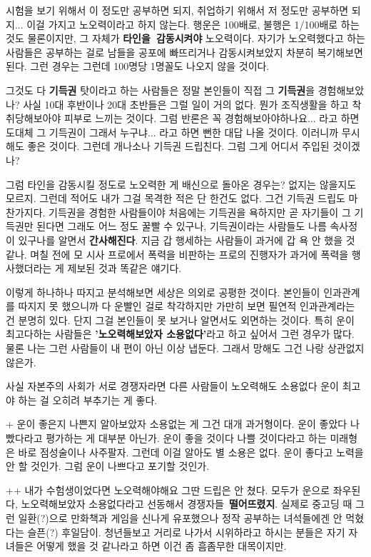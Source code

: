 시험을 보기 위해서 이 정도만 공부하면 되지, 취업하기 위해서 저 정도만 공부하면 되지... 이걸 가지고 노오력이라고 하지 않는다.
행운은 100배로, 불행은 1/100배로 하는 것도 물론이지만, 그 자체가 \textbf{타인을 감동시켜야} 노오력이다.
자기가 노오력했다고 하는 사람들은 공부하는 걸로 남들을 공포에 빠뜨리거나 감동시켜보았지 차분히 복기해보면 된다.
그런 경우는 그런데 100명당 1명꼴도 나오지 않을 것이다.
\vspace{5mm}

그것도 다 \textbf{기득권} 탓이라고 하는 사람들은 정말 본인들이 직접 그 \textbf{기득권}을 경험해보았나?
사실 10대 후반이나 20대 초반들은 그럴 일이 거의 없다. 뭔가 조직생활을 하고 착취당해보아야 피부로 느끼는 것이다.
그럼 반론은 꼭 경험해보아야하나요... 라고 하면 도대체 그 기득권이 그래서 누구냐... 라고 하면 뻔한 대답 나올 것이다.
이러니까 무시해도 좋은 것이다.
그런데 개나소나 기득권 드립친다. 그럼 그게 어디서 주입된 것이겠나?
\vspace{5mm}

그럼 타인을 감동시킬 정도로 노오력한 게 배신으로 돌아온 경우는?
없지는 않을지도 모르지. 그런데 적어도 내가 그걸 목격한 적은 단 한건도 없다.
그건 기득권 드립도 마찬가지다. 기득권을 경험한 사람들이야 처음에는 기득권을 욕하지만
곧 자기들이 그 기득권만 된다면 그래도 어느 정도 꿀빨 수 있구나, 기득권이라는 사람들도 나름 속사정이 있구나를 알면서 \textbf{간사해진다}.
지금 갑 행세하는 사람들이 과거에 갑 욕 안 했을 것 같나.
며칠 전에 모 시사 프로에서 폭력을 비판하는 프로의 진행자가 과거에 폭력을 행사했더라는 게 제보된 것과 똑같은 얘기다.
\vspace{5mm}

이렇게 하나하나 따지고 분석해보면 세상은 의외로 공평한 것이다.
본인들이 인과관계를 따지지 못 했으니까 다 운빨인 걸로 착각하지만 가만히 보면 필연적 인과관계라는 건 분명히 있다.
단지 그걸 본인들이 못 보거나 알면서도 외면하는 것이다.
특히 운이 최고다하는 사람들은 \textbf{'노오력해보았자 소용없다'}라고 하고 싶어서 그런 경우가 많다.
물론 나는 그런 사람들이 내 편이 아닌 이상 냅둔다. 그래서 망해도 그건 나랑 상관없지 않은가.
\vspace{5mm}

사실 자본주의 사회가 서로 경쟁자라면 다른 사람들이 노오력해도 소용없다 운이 최고야 하는 걸 오히려 부추기는 게 좋다.
\vspace{5mm}

+ 운이 좋은지 나쁜지 알아보았자 소용없는 게
그건 대개 과거형이다. 운이 좋았다 나빴다라고 평가하는 게 대부분 아닌가.
운이 좋을 것이다 나쁠 것이다라고 하는 미래형은 바로 점성술이나 사주팔자. 그런데 이걸 알아도 별 소용은 없다.
운이 좋다고 노력을 안 할 것인가. 그럼 운이 나쁘다고 포기할 것인가.
\vspace{5mm}

++ 내가 수험생이었다면 노오력해야해요 그딴 드립은 안 쳤다.
모두가 운으로 좌우된다, 노오력해보았자 소용없다라고 선동해서 경쟁자들 \textbf{떨어뜨렸지}.
실제로 중고딩 때 그런 일환(?)으로 만화책과 게임을 신나게 유포했으나 정작 공부하는 녀석들에겐 안 먹혔다는 슬픈(?) 후일담이.
청년들보고 거리로 나가서 시위하라고 하시는 분들은 자기 자녀들은 어떻게 했을 것 같나라고 하면 이건 좀 흠좀무한 대목이지만.
\vspace{5mm}




